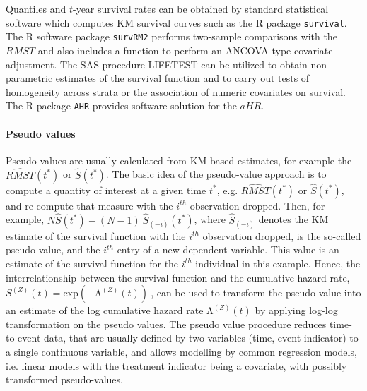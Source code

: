 \noindent 


\noindent Quantiles and $t$-year survival rates can be obtained by standard statistical software which computes KM survival curves such as the R package \texttt{survival}. The R software package \texttt{survRM2} performs two-sample comparisons with the $RMST$ and also includes a function to perform an ANCOVA-type covariate adjustment. The SAS procedure LIFETEST can be utilized to obtain non-parametric estimates of the survival function and to carry out tests of homogeneity across strata or the association of numeric covariates on survival. The R package \texttt{AHR} provides software solution for the $aHR$. 

\noindent 

\paragraph{Pseudo values}\label{pseudo} 

\noindent 

\noindent Pseudo-values are usually calculated from KM-based estimates, for example the $\widehat{RMST}(t^*)$ or $\hat{S}(t^*)$. The basic idea of the pseudo-value approach is to compute a quantity of interest at a given time $t^*$, e.g. $\widehat{RMST}(t^*)$ or $\hat{S}(t^*)$, and re-compute that measure with the $i^{th}$ observation dropped. Then, for example, $N\hat{S}\left(t^*\right)-\left(N-1\right)\ {\hat{S}}_{\left(-i\right)}(t^*)$, where ${\hat{S}}_{\left(-i\right)}$ denotes the KM estimate of the survival function with the $i^{th}$ observation dropped, is the so-called pseudo-value, and the $i^{th}$ entry of a new dependent variable. This value is an estimate of the survival function for the $i^{th}$ individual in this example. Hence, the interrelationship between the survival function and the cumulative hazard rate, $S^{\left(Z\right)}\left(t\right)={\mathrm{exp} (-{\mathrm{\Lambda }}^{\left(Z\right)}(t))\ }$, can be used to transform the pseudo value into an estimate of the log cumulative hazard rate ${\mathrm{\Lambda }}^{\left(Z\right)}(t)$ by applying log-log transformation on the pseudo values. The pseudo value procedure reduces time-to-event data, that are usually defined by two variables (time, event indicator) to a single continuous variable, and allows modelling by common regression models, i.e. linear models with the treatment indicator being a covariate, with possibly transformed pseudo-values. \cite{Andersen.2004} 

